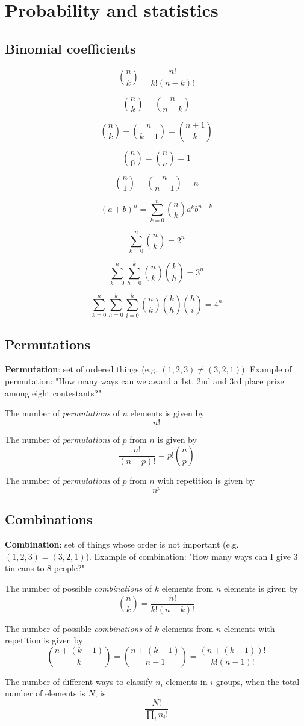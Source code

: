 \chapter{Probability and statistics}

\section{Binomial coefficients}
\begin{multicols}{3}
	
	\[ \binom{n}{k} = \frac{n!}{k!(n-k)!} \]
	
	\[ \binom{n}{k} = \binom{n}{n-k} \]
	
	\[ \binom{n}{k} + \binom{n}{k-1} = \binom{n+1}{k} \]
	
	\[ \binom{n}{0} = \binom{n}{n} = 1 \]
	
	\[ \binom{n}{1} = \binom{n}{n-1} = n \]
	
	\[ (a+b)^n = \sum_{k=0}^{n}\binom{n}{k}a^kb^{n-k} \]
	
	\[ \sum_{k=0}^{n}\binom{n}{k} = 2^n \]
	
	\[ \sum_{k=0}^{n}\sum_{h=0}^{k}\binom{n}{k}\binom{k}{h} = 3^n \]
	
	\[ \sum_{k=0}^{n}\sum_{h=0}^{k}\sum_{i=0}^{h}\binom{n}{k}\binom{k}{h}\binom{h}{i} = 4^n \]
	
\end{multicols}

\section{Permutations}
\textbf{Permutation}: set of ordered things (e.g. $(1,2,3)\ne(3,2,1)$).
Example of permutation: "How many ways can we award a 1st, 2nd and 3rd place prize among eight contestants?"

The number of {\it permutations} of $n$ elements is given by $$n!$$

The number of {\it permutations} of $p$ from $n$ is given by
\[
\frac{n!}{(n-p)!}=p!{n\choose p}
\]

The number of {\it permutations} of $p$ from $n$ with repetition is given by
\[
n^p
\]

\section{Combinations}
\textbf{Combination}: set of things whose order is not important (e.g. $(1,2,3)=(3,2,1)$).
Example of combination: "How many ways can I give 3 tin cans to 8 people?"

The number of possible {\it combinations} of $k$ elements from $n$ elements is given by
\[
{n\choose k}=\frac{n!}{k!(n-k)!}
\]

The number of possible {\it combinations} of $k$ elements from $n$ elements with repetition is given by
\[
{n+(k-1)\choose k}={n+(k-1)\choose n-1}=\frac{(n+(k-1))!}{k!(n-1)!}
\]

The number of different ways to classify $n_i$ elements in $i$ groups, when
the total number of elements is $N$, is
\[
\frac{N!}{\prod\limits_i n_i!}
\]
